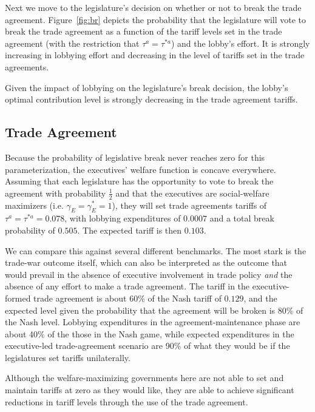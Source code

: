\documentclass[10pt]{article}
\newcommand{\ga}{\gamma}
\begin{document}
Next we move to the legislature's decision on whether or not to break the trade agreement. Figure~\ref{fig:br} depicts the probability that the legislature will vote to break the trade agreement as a function of the tariff levels set in the trade agreement (with the restriction that $\tau^a = \tau^{*a}$) and the lobby's effort. It is strongly increasing in lobbying effort and decreasing in the level of tariffs set in the trade agreements.

Given the impact of lobbying on the legislature's break decision, the lobby's optimal contribution level is strongly decreasing in the trade agreement tariffs.%

\subsection{Trade Agreement}
Because the probability of legislative break never reaches zero for this parameterization, the executives' welfare function is concave everywhere. Assuming that each legislature has the opportunity to vote to break the agreement with probability $\frac{1}{2}$ and that the executives are social-welfare maximizers (i.e. $\ga_E = \ga_E^* = 1$), they will set trade agreements tariffs of $\tau^a = \tau^{*a} = 0.078$, with lobbying expenditures of $0.0007$ and a total break probability of $0.505$. The expected tariff is then $0.103$.

We can compare this against several different benchmarks. The most stark is the trade-war outcome itself, which can also be interpreted as the outcome that would prevail in the absence of executive involvement in trade policy \textit{and} the absence of any effort to make a trade agreement. The tariff in the executive-formed trade agreement is about 60$\%$ of the Nash tariff of $0.129$, and the expected level given the probability that the agreement will be broken is 80$\%$ of the Nash level. Lobbying expenditures in the agreement-maintenance phase are about 40$\%$ of the those in the Nash game, while expected expenditures in the executive-led trade-agreement scenario are 90$\%$ of what they would be if the legislatures set tariffs unilaterally.

Although the welfare-maximizing governments here are not able to set and maintain tariffs at zero as they would like, they are able to achieve significant reductions in tariff levels through the use of the trade agreement.
\end{document}
